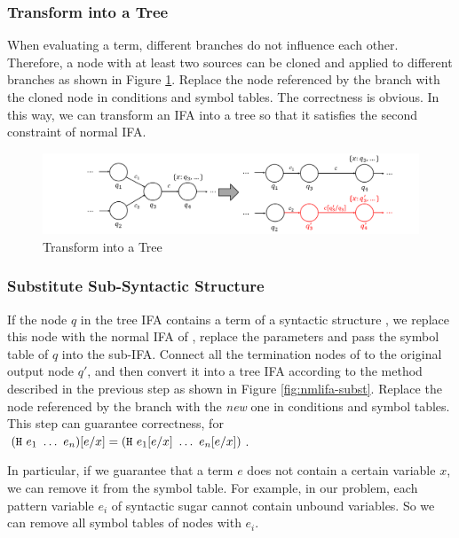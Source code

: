 \subsubsection{Transform into a Tree}

When evaluating a term, different branches do not influence each other. Therefore, a node with at least two sources can be cloned and applied to different branches as shown in Figure \ref{fig:nmlifa-tree}. Replace the node referenced by the branch with the cloned node in conditions and symbol tables. The correctness is obvious. In this way, we can transform an IFA into a tree so that it satisfies the second constraint of normal IFA.

\begin{figure}[t]
    \centering
    \includegraphics[scale=0.25]{images/nmlifa/nmlifa-tree.png}
    \caption{Transform into a Tree}
    \label{fig:nmlifa-tree}
\end{figure}

\subsubsection{Substitute Sub-Syntactic Structure}
\label{mark:hygieneinderive}

If the node $q$ in the tree IFA contains a term of a syntactic structure , we replace this node with the normal IFA of , replace the parameters and pass the symbol table of $q$ into the sub-IFA. Connect all the termination nodes of  to the original output node $q'$, and then convert it into a tree IFA according to the method described in the previous step as shown in Figure \ref{fig:nmlifa-subst}. Replace the node referenced by the branch with the \textit{new} one in conditions and symbol tables. This step can guarantee correctness, for $(\mbox{\tt H}~e_1~\ldots~e_n)[e/x] = (\mbox{\tt H}~e_1[e/x]~\ldots~e_n[e/x])$.

In particular, if we guarantee that a term $e$ does not contain a certain variable $x$, we can remove it from the symbol table. For example, in our problem, each pattern variable $e_i$ of syntactic sugar cannot contain unbound variables. So we can remove all symbol tables of nodes with $e_i$.

